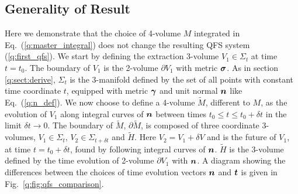 \subsection{Generality of Result} \label{q:sect:generality}
Here we demonstrate that the choice of 4-volume $M$ integrated in Eq.~(\ref{q:master_integral}) does not change the resulting QFS system (\ref{q:first_qfs}). We start by defining the extraction 3-volume $V_1\in\Sigma_t$ at time $t=t_0$. The boundary of $V_1$ is the 2-volume $\partial V_1$ with metric $\boldsymbol{\sigma}$. As in section \ref{q:sect:derive}, $\Sigma_t$ is the 3-manifold defined by the set of all points with constant time coordinate $t$, equipped with metric $\boldsymbol{\gamma}$ and unit normal $\boldsymbol{n}$ like Eq.~(\ref{q:n_def}). We now choose to define a 4-volume $\tilde{M}$, different to $M$, as the evolution of $V_1$ along integral curves of $\boldsymbol{n}$ between times $t_0 \leq t \leq t_0 + \delta t$ in the limit $\delta t \rightarrow 0$. The boundary of $\tilde{M}$, $\partial \tilde M$, is composed of three coordinate 3-volumes, $V_1\in\Sigma_t$, $V_2\in\Sigma_{t+\delta t}$ and $\tilde{H}$. Here $V_2=V_1 + \delta V$ and is the future of $V_1$, at time $t=t_0 +\delta t$, found by following integral curves of $\boldsymbol{n}$. $\tilde{H}$ is the 3-volume defined by the time evolution of 2-volume $\partial V_1$ with $\boldsymbol{n}$. A diagram showing the differences between the choices of time evolution vectors $\boldsymbol{n}$ and $\boldsymbol{t}$ is given in Fig.~\ref{q:fig:qfs_comparison}.


